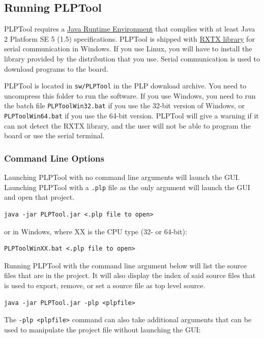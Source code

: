 \documentclass{article}
\begin{document}
\subsection{Running PLPTool}
PLPTool requires a 
\href{http://www.oracle.com/technetwork/java/javase/downloads/index.html}{Java Runtime Environment}
that complies with at least Java 2 Platform SE 5 (1.5) specifications. PLPTool 
is shipped with 
\href{http://rxtx.qbang.org/wiki/index.php/Main_Page}{RXTX library}
for serial communication in Windows. If you use Linux, you will have to 
install the library provided by the distribution that you use. Serial 
communication is used to download programs to the board.

PLPTool is located in \verb+sw/PLPTool+ in the PLP download archive. You 
need to uncompress this folder to run the software. If you use Windows, you 
need to run the batch file \verb+PLPToolWin32.bat+ if you use the 32-bit 
version of Windows, or \verb+PLPToolWin64.bat+ if you use the 64-bit version. 
PLPTool will give a 
warning if it can not detect the RXTX library, and the user will not be 
able to program the board or use the serial terminal. 
\subsubsection{Command Line Options}
Launching PLPTool with no command line arguments will launch the GUI. Launching PLPTool with a \verb+.plp+ file as the only argument will launch the GUI and 
open that project.

\begin{verbatim}
java -jar PLPTool.jar <.plp file to open>
\end{verbatim}

or in Windows, where XX is the CPU type (32- or 64-bit):

\begin{verbatim}
PLPToolWinXX.bat <.plp file to open>
\end{verbatim}

Running PLPTool with the command line argument below will list the source files that are in the project. It will also display the index of said source files that is used to export, remove, or set a source file as top level source.

\begin{verbatim}
java -jar PLPTool.jar -plp <plpfile>
\end{verbatim}

The \verb+-plp <plpfile>+ command can also take additional arguments that can be used to manipulate the project file without launching the GUI: 
\end{document}
